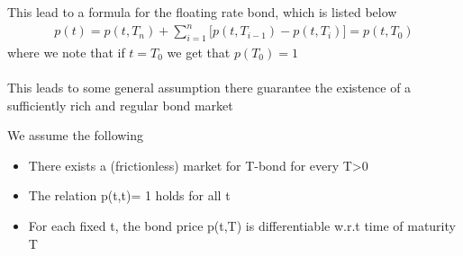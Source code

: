 This lead to a formula for the floating rate bond, which is listed below \cite{Bjork}
\begin{align*}
    p(t)= p(t,T_n) + \sum_{i=1}^{n}\Big[p(t,T_{i-1})-p(t,T_i)\Big] = p(t,T_0)
\end{align*}
where we note that if $t=T_0$ we get that $p(T_0)=1$
\\\\
This leads to some general assumption there guarantee the existence of a sufficiently 
rich and regular bond market
\begin{assumption}\label{def:market}
    We assume the following
    \begin{itemize}
        \item There exists a (frictionless) market for T-bond for every T>0
        \item The relation p(t,t)= 1 holds for all t
        \item For each fixed t, the bond price p(t,T) is differentiable w.r.t time of maturity T \cite{Bjork}
    \end{itemize}
\end{assumption}
